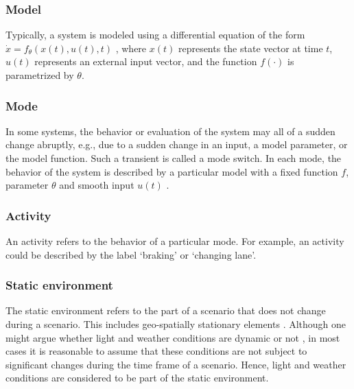 \subsubsection{Model}
\label{sec:model}
Typically, a system is modeled using a differential equation of the form $\dot{x}=f_{\theta}(x(t), u(t), t)$ \cite{norman2011control}, where $x(t)$ represents the state vector at time $t$, $u(t)$ represents an external input vector, and the function $f(\cdot)$ is parametrized by $\theta$.

\subsubsection{Mode}
\label{sec:mode}
In some systems, the behavior or evaluation of the system may all of a sudden change abruptly, e.g., due to a sudden change in an input, a model parameter, or the model function. Such a transient is called a mode switch.
In each mode, the behavior of the system is described by a particular model with a fixed function $f$, parameter $\theta$ and smooth input $u(t)$ \cite{deschutter2000optimal}.

\subsubsection{Activity}
\label{sec:activity}
An activity refers to the behavior of a particular mode. For example, an activity could be described by the label `braking' or `changing lane'.

\subsubsection{Static environment}
\label{sec:static environment}
The static environment refers to the part of a scenario that does not change during a scenario. This includes geo-spatially stationary elements \cite{ulbrich2015}. Although one might argue whether light and weather conditions are dynamic or not \cite{geyer2014,bach2016modelbased}, in most cases it is reasonable to assume that these conditions are not subject to significant changes during the time frame of a scenario. Hence, light and weather conditions are considered to be part of the static environment.

